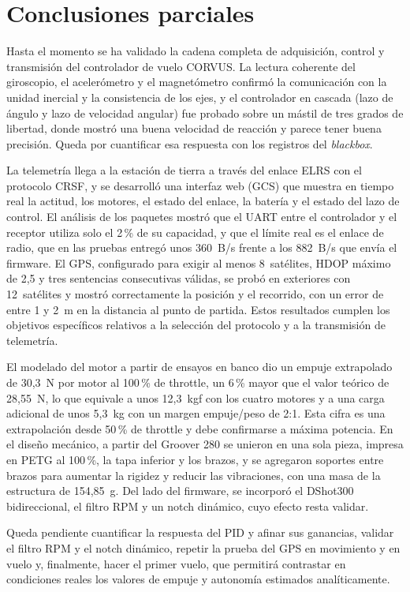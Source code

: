 \documentclass[12pt, letterpaper]{report}
\begin{document}
\section{Conclusiones parciales}

Hasta el momento se ha validado la cadena completa de adquisición, control y
transmisión del controlador de vuelo CORVUS. La lectura coherente del giroscopio,
el acelerómetro y el magnetómetro confirmó la comunicación con la unidad inercial
y la consistencia de los ejes, y el controlador en cascada (lazo de ángulo y lazo
de velocidad angular) fue probado sobre un mástil de tres grados de libertad,
donde mostró una buena velocidad de reacción y parece tener buena precisión. Queda
por cuantificar esa respuesta con los registros del \textit{blackbox}.

La telemetría llega a la estación de tierra a través del enlace ELRS con el
protocolo CRSF, y se desarrolló una interfaz web (GCS) que muestra en tiempo real
la actitud, los motores, el estado del enlace, la batería y el estado del lazo de
control. El análisis de los paquetes mostró que el UART entre el controlador y el
receptor utiliza solo el 2\,\% de su capacidad, y que el límite real es el enlace
de radio, que en las pruebas entregó unos 360~B/s frente a los 882~B/s que envía
el firmware. El GPS, configurado para exigir al menos 8~satélites, HDOP máximo de
2,5 y tres sentencias consecutivas válidas, se probó en exteriores con 12~satélites
y mostró correctamente la posición y el recorrido, con un error de entre 1 y 2~m
en la distancia al punto de partida. Estos resultados cumplen los objetivos
específicos relativos a la selección del protocolo y a la transmisión de telemetría.

El modelado del motor a partir de ensayos en banco dio un empuje extrapolado de
30,3~N por motor al 100\,\% de throttle, un 6\,\% mayor que el valor teórico de
28,55~N, lo que equivale a unos 12,3~kgf con los cuatro motores y a una carga
adicional de unos 5,3~kg con un margen empuje/peso de 2:1. Esta cifra es una
extrapolación desde 50\,\% de throttle y debe confirmarse a máxima potencia. En el
diseño mecánico, a partir del Groover 280 se unieron en una sola pieza, impresa
en PETG al 100\,\%, la tapa inferior y los brazos, y se agregaron soportes entre
brazos para aumentar la rigidez y reducir las vibraciones, con una masa de
la estructura de 154,85~g. Del lado del firmware, se incorporó el DShot300
bidireccional, el filtro RPM y un notch dinámico, cuyo efecto resta validar.

Queda pendiente cuantificar la respuesta del PID y afinar sus ganancias, validar
el filtro RPM y el notch dinámico, repetir la prueba del GPS en movimiento y en
vuelo y, finalmente, hacer el primer vuelo, que permitirá contrastar en condiciones
reales los valores de empuje y autonomía estimados analíticamente.
\end{document}
